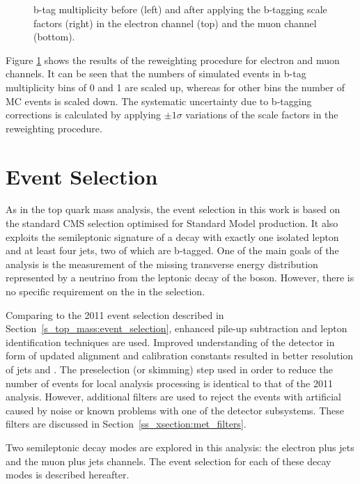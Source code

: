 \begin{figure}[!htpb]
    \caption[b-tag multiplicity before and after applying the b-tagging scale factors]{b-tag multiplicity before (left)
    and after applying the b-tagging scale factors (right) in the electron channel (top) and the muon channel (bottom).}
    \label{fig:bjet_weights}
\end{figure}

Figure \ref{fig:bjet_weights} shows the results of the reweighting procedure for electron and muon channels. It can be
seen that the numbers of simulated events in b-tag multiplicity bins of \num{0} and \num{1} are scaled up, whereas for
other bins the number of MC events is scaled down. The systematic uncertainty due to b-tagging corrections is calculated
by applying $\pm 1 \sigma$ variations of the scale factors in the reweighting procedure.

\section{Event Selection}
\label{s_xsection:event_selection}
As in the top quark mass analysis, the event selection in this work is based on the standard CMS selection optimised for
Standard Model \ttbar production. It also exploits the semileptonic signature of a \ttbar decay with exactly one
isolated lepton and at least four jets, two of which are b-tagged. One of the main goals of the analysis is the
measurement of the missing transverse energy distribution represented by a neutrino from the leptonic decay of the \W
boson. However, there is no specific requirement on the \MET in the selection.

Comparing to the 2011 event selection described in Section~\ref{s_top_mass:event_selection}, enhanced pile-up
subtraction and lepton identification techniques are used. Improved understanding of the detector in form of updated
alignment and calibration constants resulted in better resolution of jets and \MET. The preselection (or skimming) step
used in order to reduce the number of events for local analysis processing is identical to that of the 2011 analysis.
However, additional filters are used to reject the events with artificial \MET caused by noise or known problems with
one of the detector subsystems. These filters are discussed in Section~\ref{ss_xsection:met_filters}.

Two semileptonic \ttbar decay modes are explored in this analysis: the electron plus jets and the muon plus jets
channels. The event selection for each of these decay modes is described hereafter.

